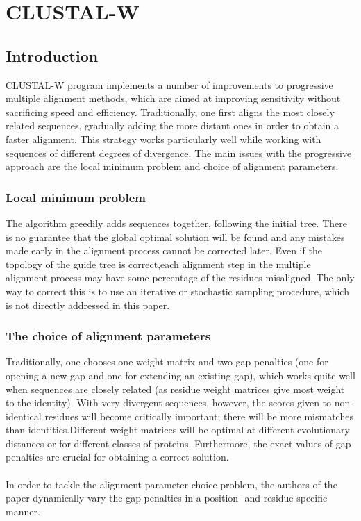 \chapter{CLUSTAL-W}

\section{Introduction}
CLUSTAL-W program implements a number of improvements to progressive multiple alignment methods, which are aimed at improving sensitivity without sacrificing speed and efficiency.  
Traditionally, one first aligns the most closely related sequences, gradually adding the more distant ones in order to obtain a faster alignment. This strategy works particularly well while working with sequences of different degrees of divergence.
The main issues with the progressive approach are the local minimum problem and choice of alignment parameters.

\subsection{Local minimum problem}
The algorithm greedily adds sequences together, following the initial tree. There is no guarantee that the global optimal solution will be found and any mistakes made early in the alignment process cannot be corrected later. Even if the topology of the guide tree is correct,each alignment step in the multiple alignment process may have some percentage of the residues misaligned. The only way to correct this is to use an iterative or stochastic sampling procedure, which is not directly addressed in this paper.

\subsection{The choice of alignment parameters}
Traditionally, one chooses one weight matrix and two gap penalties (one for opening a new gap and one for extending an existing gap), which works quite well when sequences are closely related (as residue weight matrices give most weight to the identity).  With very divergent sequences, however, the scores given to non-identical residues will become critically important; there will be more mismatches than identities.Different weight matrices will be optimal at different evolutionary distances or for different classes of proteins. Furthermore, the exact values of gap penalties are crucial for obtaining a correct solution.
\\
\\
\noindent
In order to tackle the alignment parameter choice problem, the authors of the paper dynamically vary the gap penalties in a position- and residue-specific manner. 

